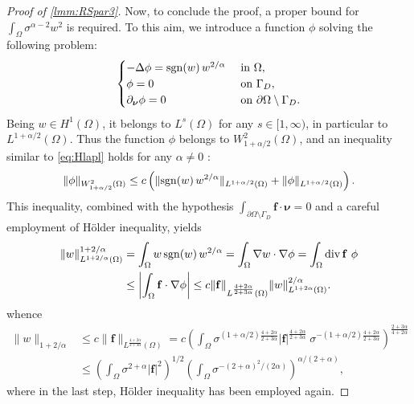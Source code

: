\documentclass[final,hidelinks]{siamart1116Arxiv}
\numberwithin{theorem}{section}
\newcommand{\Div}{{\rm div}\,}
\newcommand{\normal}{{\boldsymbol \nu}}
\newcommand{\sgn}{{\rm sgn}}
\begin{document}
\begin{proof}[Proof of \cref{lmm:RSpar3}]
 Now, to conclude the proof, a proper bound for $\int_\Omega\sigma^{\alpha-2}w^2$ is required.
 To this aim, we introduce a function $\phi$ solving the following problem:
 \begin{equation}\begin{cases}
  -\Delta\phi = \sgn(w)\,w^{2/\alpha} & \text{ in }\Omega,\\
  \phi = 0 & \text{ on }\Gamma_D,\\
  \partial_\normal\phi = 0 & \text{ on }\partial\Omega\setminus\Gamma_D.
 \end{cases}\end{equation}
 Being $w\in H^1(\Omega)$, it belongs to $L^s(\Omega)$ for any $s\in[1,\infty)$, in particular to $L^{1+\alpha/2}(\Omega)$.
 Thus the function $\phi$ belongs to $W^2_{1+\alpha/2}(\Omega)$, and an inequality similar to \cref{eq:Hlapl} holds for any $\alpha\neq0$ \cite[Theorem 4.3.2.4]{Grisvard}:
 \begin{equation}
  \|\phi\|_{W^2_{1+\alpha/2}(\Omega)} \leq c\left(\|\sgn(w)\,w^{2/\alpha}\|_{L^{1+\alpha/2}(\Omega)} + \|\phi\|_{L^{1+\alpha/2}(\Omega)}\right).
 \end{equation}
 This inequality, combined with the hypothesis $\int_{\partial\Omega\setminus\Gamma_D}\mathbf f\cdot\normal =0$ and a careful employment of H\"older inequality, yields
 \begin{align}
  \|w\|_{L^{1+2/\alpha}(\Omega)}^{1+2/\alpha} &= \int_\Omega w\,\sgn(w)\,w^{2/\alpha} = \int_\Omega \nabla w\cdot\nabla\phi = \int_\Omega\Div\mathbf f\ \phi \\
  &\leq \left|\int_\Omega\mathbf f\cdot\nabla\phi\right|\leq c\|\mathbf f\|_{L^{\frac{4+2\alpha}{2+3\alpha}}(\Omega)}\|w\|_{L^{1+2\alpha}(\Omega)}^{2/\alpha}.
 \end{align}
 whence
 \begin{equation}\label{eq:holderfancy}\begin{aligned}
  \|w\|_{1+2/\alpha}&\leq c\|\mathbf f\|_{L^{\frac{4+2\alpha}{2+3\alpha}}(\Omega)}= c\left(\int_\Omega\sigma^{(1+\alpha/2)\frac{4+2\alpha}{2+3\alpha}}|\mathbf f|^\frac{4+2\alpha}{2+3\alpha}\ \sigma^{-(1+\alpha/2)\frac{4+2\alpha}{2+3\alpha}}\right)^\frac{2+3\alpha}{4+2\alpha}\\
  &\leq\left(\int_\Omega\sigma^{2+\alpha}|\mathbf f|^2\right)^{1/2}\left(\int_\Omega\sigma^{-(2+\alpha)^2/(2\alpha)}\right)^{\alpha/(2+\alpha)},
 \end{aligned}\end{equation}
 where in the last step, H\"older inequality has been employed again.

\end{proof}
\end{document}
